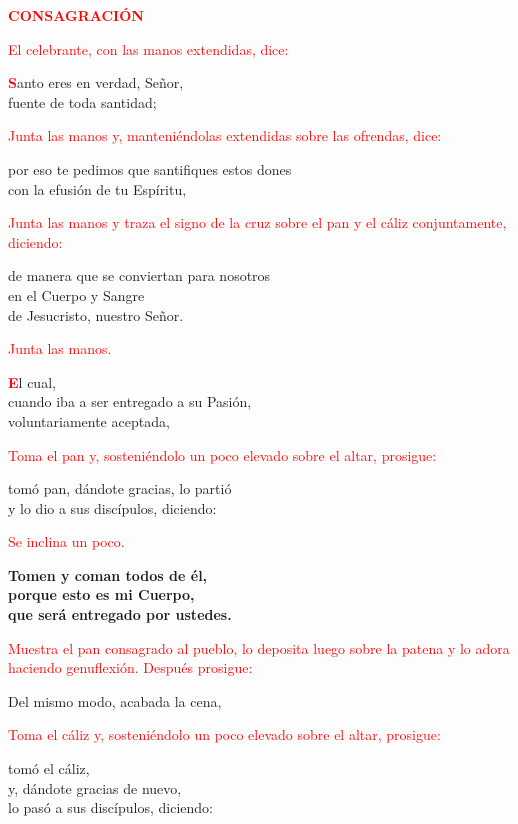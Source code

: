 \documentclass[12pt, letterpaper]{report}
\begin{document}
\Large {\bfseries \textcolor{red}{CONSAGRACI\'ON}} 

\large{\textcolor{red}{El celebrante, con las manos extendidas, dice:}}

\lettrine[lines=1]{\bfseries \textcolor{red}{S}}{}\Large anto eres en verdad, Se\~nor,\\
fuente de toda santidad;

\large{\textcolor{red}{Junta las manos y, manteni\'endolas extendidas sobre las ofrendas, dice:}}

\noindent
\Large por eso te pedimos que santifiques estos dones\\
con la efusi\'on de tu Esp\'iritu,

\large{\textcolor{red}{Junta las manos y traza el signo de la cruz sobre el pan y el c\'aliz conjuntamente, diciendo:}}

\noindent
\Large de manera que se conviertan para nosotros\\
en el Cuerpo y \Huge{\textcolor{red}{}} \Large Sangre\\
de Jesucristo, nuestro Se\~nor.

\large{\textcolor{red}{Junta las manos.}}

\lettrine[lines=1]{\bfseries \textcolor{red}{E}}{}\Large l cual,\\
cuando iba a ser entregado a su Pasi\'on,\\
voluntariamente aceptada,

\large{\textcolor{red}{Toma el pan y, sosteni\'endolo un poco elevado sobre el altar, prosigue:}}

\noindent
\Large tom\'o pan, d\'andote gracias, lo parti\'o\\
y lo dio a sus disc\'ipulos, diciendo:

\large{\textcolor{red}{Se inclina un poco.}} 

\noindent
\LARGE{\bfseries{Tomen y coman todos de \'el,\\
porque esto es mi Cuerpo,\\
que ser\'a entregado por ustedes.}}

\large{\textcolor{red}{Muestra el pan consagrado al pueblo, lo deposita luego sobre la patena y lo adora haciendo genuflexi\'on. Despu\'es prosigue:}}

\noindent
\Large Del mismo modo, acabada la cena,

\large{\textcolor{red}{Toma el c\'aliz y, sosteni\'endolo un poco elevado sobre el altar, prosigue:}}

\noindent
\Large tom\'o el c\'aliz,\\
y, d\'andote gracias de nuevo,\\
lo pas\'o a sus disc\'ipulos, diciendo:
\end{document}

